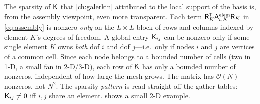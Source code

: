 The sparsity of $\mathsf{K}$ that \cref{ch:galerkin} attributed to the local support
of the basis is, from the assembly viewpoint, even more transparent. Each term
$\mathsf{R}_K^{\mathsf T}\mathsf{A}^{\mathrm{elem}}_{t,K}\mathsf{R}_K$ in \cref{eq:assembly}
is nonzero \emph{only} on the $L\times L$ block of rows and columns indexed by
element $K$'s degrees of freedom. A global entry $\mathsf{K}_{ij}$ can be nonzero
only if some single element $K$ owns \emph{both} dof $i$ and dof $j$---i.e.\ only
if nodes $i$ and $j$ are vertices of a common cell. Since each node belongs to a
bounded number of cells (two in 1-D, a small fan in 2-D/3-D), each row of
$\mathsf{K}$ has only a bounded number of nonzeros, independent of how large the mesh
grows. The matrix has $\mathcal{O}(N)$ nonzeros, not $N^2$. The sparsity
\emph{pattern} is read straight off the gather tables: $\mathsf{K}_{ij}\neq0$ iff
$i,j$ share an element.  shows a small 2-D example.

